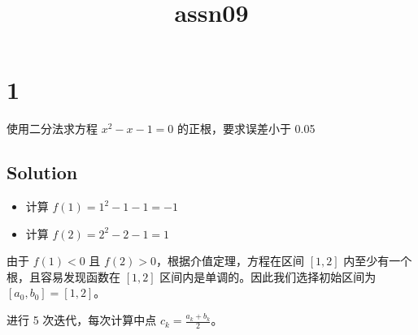 \documentclass[11pt]{article}
\title{assn09}
\providecommand{\tightlist}{%
      \setlength{\itemsep}{0pt}\setlength{\parskip}{0pt}}
\begin{document}
    
    \maketitle
    
    

    
    \section{1}\label{section}

使用二分法求方程 \(x^2 - x - 1 = 0\) 的正根，要求误差小于 0.05

\subsection{Solution}\label{solution}

\begin{itemize}
\tightlist
\item
  计算 \(f(1) = 1^2 - 1 - 1 = -1\)
\item
  计算 \(f(2) = 2^2 - 2 - 1 = 1\)
\end{itemize}

由于 \(f(1) < 0\) 且 \(f(2) > 0\)，根据介值定理，方程在区间 \([1, 2]\)
内至少有一个根，且容易发现函数在 \([1, 2]\)
区间内是单调的。因此我们选择初始区间为 \([a_0, b_0] = [1, 2]\)。

进行 5 次迭代，每次计算中点 \(c_k = \frac{a_k + b_k}{2}\)。
\end{document}
